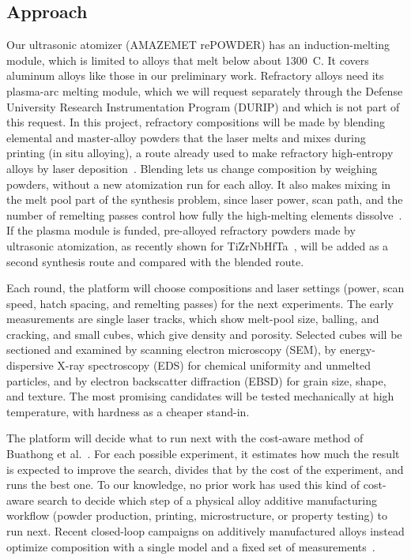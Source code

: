 \documentclass[12pt,letterpaper]{article}
\newcommand{\degC}{\textdegree{}C}
\begin{document}
\subsection{Approach}
Our ultrasonic atomizer (AMAZEMET rePOWDER) has an induction-melting module,
which is limited to alloys that melt below about 1300~\degC. It covers
aluminum alloys like those in our preliminary work. Refractory alloys need its
plasma-arc melting module, which we will request separately through the
Defense University Research Instrumentation Program (DURIP) and which is not
part of this request. In this project, refractory compositions will be made by
blending elemental and master-alloy powders that the laser melts and mixes
during printing (in situ alloying), a route already used to make refractory
high-entropy alloys by laser deposition~\cite{dobbelstein2019}. Blending lets
us change composition by weighing powders, without a new atomization run for
each alloy. It also makes mixing in the melt pool part of the synthesis
problem, since laser power, scan path, and the number of remelting passes
control how fully the high-melting elements dissolve~\cite{yeung2026}. If the
plasma module is funded, pre-alloyed refractory powders made by ultrasonic
atomization, as recently shown for TiZrNbHfTa~\cite{dodge2026}, will be added
as a second synthesis route and compared with the blended route.

Each round, the platform will choose compositions and laser settings (power,
scan speed, hatch spacing, and remelting passes) for the next experiments. The
early measurements are single laser tracks, which show melt-pool size,
balling, and cracking, and small cubes, which give density and porosity.
Selected cubes will be sectioned and examined by scanning electron microscopy
(SEM), by energy-dispersive X-ray spectroscopy (EDS) for chemical uniformity
and unmelted particles, and by electron backscatter diffraction (EBSD) for
grain size, shape, and texture. The most promising candidates will be tested
mechanically at high temperature, with hardness as a cheaper stand-in.

The platform will decide what to run next with the cost-aware method of
Buathong et al.~\cite{buathong2024}. For each possible experiment, it
estimates how much the result is expected to improve the search, divides that
by the cost of the experiment, and runs the best one. To our knowledge, no prior
work has used this kind of cost-aware search to decide which step of a
physical alloy additive manufacturing workflow (powder production, printing,
microstructure, or property testing) to run next. Recent closed-loop campaigns
on additively manufactured alloys instead optimize composition with a single
model and a fixed set of measurements~\cite{talbot2026}.
\end{document}
